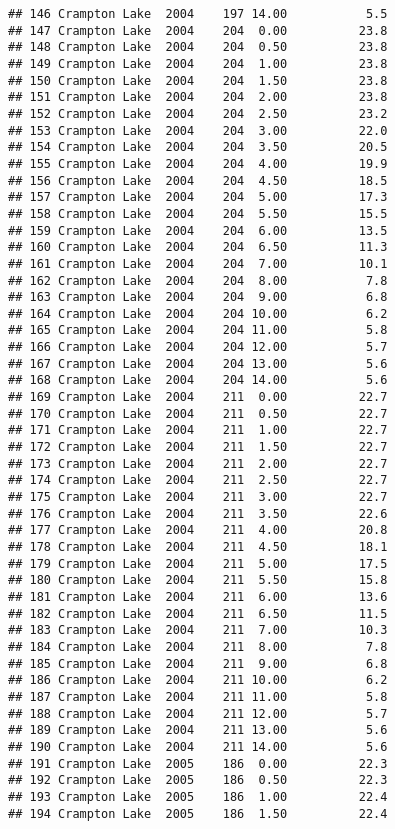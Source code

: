 \documentclass[
]{article}
\begin{document}
\begin{verbatim}
## 146 Crampton Lake  2004    197 14.00           5.5
## 147 Crampton Lake  2004    204  0.00          23.8
## 148 Crampton Lake  2004    204  0.50          23.8
## 149 Crampton Lake  2004    204  1.00          23.8
## 150 Crampton Lake  2004    204  1.50          23.8
## 151 Crampton Lake  2004    204  2.00          23.8
## 152 Crampton Lake  2004    204  2.50          23.2
## 153 Crampton Lake  2004    204  3.00          22.0
## 154 Crampton Lake  2004    204  3.50          20.5
## 155 Crampton Lake  2004    204  4.00          19.9
## 156 Crampton Lake  2004    204  4.50          18.5
## 157 Crampton Lake  2004    204  5.00          17.3
## 158 Crampton Lake  2004    204  5.50          15.5
## 159 Crampton Lake  2004    204  6.00          13.5
## 160 Crampton Lake  2004    204  6.50          11.3
## 161 Crampton Lake  2004    204  7.00          10.1
## 162 Crampton Lake  2004    204  8.00           7.8
## 163 Crampton Lake  2004    204  9.00           6.8
## 164 Crampton Lake  2004    204 10.00           6.2
## 165 Crampton Lake  2004    204 11.00           5.8
## 166 Crampton Lake  2004    204 12.00           5.7
## 167 Crampton Lake  2004    204 13.00           5.6
## 168 Crampton Lake  2004    204 14.00           5.6
## 169 Crampton Lake  2004    211  0.00          22.7
## 170 Crampton Lake  2004    211  0.50          22.7
## 171 Crampton Lake  2004    211  1.00          22.7
## 172 Crampton Lake  2004    211  1.50          22.7
## 173 Crampton Lake  2004    211  2.00          22.7
## 174 Crampton Lake  2004    211  2.50          22.7
## 175 Crampton Lake  2004    211  3.00          22.7
## 176 Crampton Lake  2004    211  3.50          22.6
## 177 Crampton Lake  2004    211  4.00          20.8
## 178 Crampton Lake  2004    211  4.50          18.1
## 179 Crampton Lake  2004    211  5.00          17.5
## 180 Crampton Lake  2004    211  5.50          15.8
## 181 Crampton Lake  2004    211  6.00          13.6
## 182 Crampton Lake  2004    211  6.50          11.5
## 183 Crampton Lake  2004    211  7.00          10.3
## 184 Crampton Lake  2004    211  8.00           7.8
## 185 Crampton Lake  2004    211  9.00           6.8
## 186 Crampton Lake  2004    211 10.00           6.2
## 187 Crampton Lake  2004    211 11.00           5.8
## 188 Crampton Lake  2004    211 12.00           5.7
## 189 Crampton Lake  2004    211 13.00           5.6
## 190 Crampton Lake  2004    211 14.00           5.6
## 191 Crampton Lake  2005    186  0.00          22.3
## 192 Crampton Lake  2005    186  0.50          22.3
## 193 Crampton Lake  2005    186  1.00          22.4
## 194 Crampton Lake  2005    186  1.50          22.4

\end{verbatim}
\end{document}
